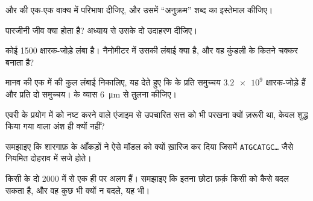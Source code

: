 \begin{exercise}[$\star$]\label{exo:g10:universal-dna:4}
 और  की एक-एक वाक्य में परिभाषा दीजिए, और उसमें
``अनुक्रम'' शब्द का इस्तेमाल कीजिए।
\end{exercise}

\begin{exercise}[$\star$]\label{exo:g10:universal-dna:5}
पारजीनी जीव क्या होता है? अध्याय से उसके दो उदाहरण दीजिए।
\end{exercise}

\begin{exercise}[$\star\star$]\label{exo:g10:universal-dna:6}
कोई  1500 क्षारक-जोड़े लंबा है। नैनोमीटर में उसकी लंबाई क्या है, और
वह कुंडली के कितने चक्कर बनाता है?
\end{exercise}

\begin{exercise}[$\star\star$]\label{exo:g10:universal-dna:7}
मानव की एक  में  की कुल लंबाई निकालिए, यह देते हुए कि
 के प्रति समुच्चय $\num{3.2e9}$ क्षारक-जोड़े हैं और प्रति
 दो समुच्चय।  के व्यास \qty{6}{\micro m} से तुलना कीजिए।
\end{exercise}

\begin{exercise}[$\star\star$]\label{exo:g10:universal-dna:8}
एवरी के प्रयोग में  को नष्ट करने वाले एंजाइम से उपचारित सत्त को भी
परखना क्यों ज़रूरी था, केवल शुद्ध किया गया  वाला अंश ही क्यों नहीं?
\end{exercise}

\begin{exercise}[$\star\star$]\label{exo:g10:universal-dna:9}
समझाइए कि शारगाफ़ के आँकड़ों ने ऐसे मॉडल को क्यों ख़ारिज कर दिया जिसमें
 \texttt{ATGCATGC\dots} जैसे नियमित दोहराव में सजे होते।
\end{exercise}

\begin{exercise}[$\star\star$]\label{exo:g10:universal-dna:10}
किसी  के दो  2000 में से एक ही  पर अलग हैं। समझाइए कि
इतना छोटा फ़र्क़ किसी  को कैसे बदल सकता है, और वह कुछ भी क्यों न
बदले, यह भी।
\end{exercise}

